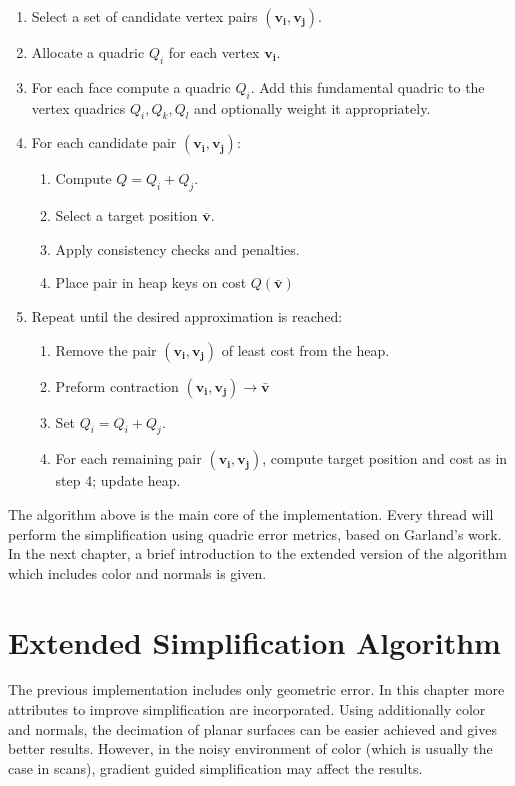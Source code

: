 \begin{enumerate}
\item Select a set of candidate vertex pairs $(\mathbf{v_i}, \mathbf{v_j})$.
\item Allocate a quadric $Q_i$ for each vertex $\mathbf{v_i}$.
\item For each face compute a quadric $Q_i$. Add this fundamental quadric to the vertex quadrics $Q_i, Q_k, Q_l$ and optionally weight it appropriately.
\item For each candidate pair $(\mathbf{v_i}, \mathbf{v_j})$:
\begin{enumerate}
\item Compute $Q = Q_i + Q_j$.
\item Select a target position $\mathbf{\bar{v}}$.
\item Apply consistency checks and penalties.
\item Place pair in heap keys on cost $Q(\mathbf{\bar{v}})$
\end{enumerate}
\item Repeat until the desired approximation is reached:
\begin{enumerate}
\item Remove the pair $(\mathbf{v_i}, \mathbf{v_j})$ of least cost from the heap.
\item Preform contraction $(\mathbf{v_i}, \mathbf{v_j})\rightarrow\bar{\mathbf{v}}$
\item Set $Q_i = Q_i + Q_j$.
\item For each remaining pair $(\mathbf{v_i}, \mathbf{v_j})$, compute target position and cost as in step 4; update heap.
\end{enumerate}
\end{enumerate}

The algorithm above is the main core of the implementation. Every thread will perform the simplification using quadric error metrics, based on Garland's work. In the next chapter, a brief introduction to the extended version of the algorithm which includes color and normals is given.

\chapter{Extended Simplification Algorithm}

The previous implementation includes only geometric error. In this chapter more attributes to improve simplification are incorporated. Using additionally color and normals, the decimation of planar surfaces can be easier achieved and gives better results. However, in the noisy environment of color (which is usually the case in scans), gradient guided simplification may affect the results.

